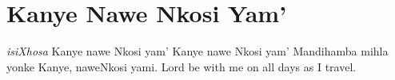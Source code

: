 \starttocol
\chapter{Kanye Nawe Nkosi Yam'}
\nexttocol
\hfill{\it isiXhosa}
\stoptocol
\starttocol
\startlines
K{\sc anye} nawe Nkosi yam'
Kanye nawe Nkosi yam'
Mandihamba mihla yonke
Kanye, naweNkosi yami.
\stoplines
\nexttocol
Lord be with me on all days as I travel.
\stoptocol
